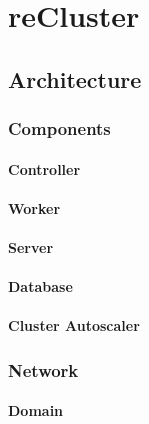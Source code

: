 \chapter{reCluster}
\label{cha:recluster}

\section{Architecture}
\label{sec:recluster_architecture}

\subsection{Components}
\label{subsec:recluster_architecture_components}

\subsubsection{Controller}
\label{subsubsec:recluster_architecture_components_controller}

\subsubsection{Worker}
\label{subsubsec:recluster_architecture_components_worker}

\subsubsection{Server}
\label{subsubsec:recluster_architecture_components_server}

\subsubsection{Database}
\label{subsubsec:recluster_architecture_components_database}

\subsubsection{Cluster Autoscaler}
\label{subsubsec:recluster_architecture_components_cluster_autoscaler}

\subsection{Network}
\label{subsec:recluster_architecture_network}

\subsubsection{Domain}
\label{subsubsec:recluster_architecture_network_domain}

